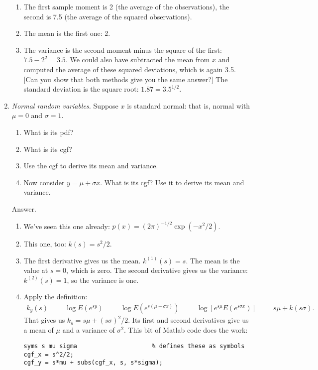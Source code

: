 \documentclass[11pt]{article}
\begin{document}
\begin{enumerate}
\begin{enumerate}
\item The first sample moment is 2 (the average of the observations),
the second is 7.5 (the average of the squared observations).
\item The mean is the first one:  2.
\item The variance is the second moment minus the square of the first:
$7.5 - 2^2 = 3.5 $.
We could also have subtracted the mean from $x$
and computed the average of these squared deviations, which is again 3.5.
[Can you show that both methods give you the same answer?]
The standard deviation is the square root:  $1.87 = 3.5^{1/2} $.
\end{enumerate}

\item {\it Normal random variables.\/}
Suppose $x$ is standard normal:  that is, normal with $\mu = 0$ and $\sigma = 1$.
\begin{enumerate}
\item What is its pdf?
\item What is its cgf?
\item Use the cgf to derive its mean and variance.
\item Now consider $y = \mu + \sigma x$.
What is its cgf?
Use it to derive its mean and variance.
\end{enumerate}
%
Answer.
\begin{enumerate}
\item We've seen this one already:
$ p(x) = (2 \pi)^{-1/2} \exp(-x^2/2)$.
\item This one, too:  $ k(s) = s^2/2$.
\item The first derivative gives us the mean.
$k^{(1)}(s) = s$.
The mean is the value at $s=0$, which is zero.
The second derivative gives us the variance:
$k^{(2)}(s) = 1$,
so the variance is one.
\item Apply the definition:
\begin{eqnarray*}
    k_y(s) &=& \log E (e^{sy})
            \;\;=\;\; \log E (e^{s(\mu + \sigma x)})
             \;\;=\;\; \log \left[ e^{s\mu} E ( e^{ s\sigma x}) \right]
             \;\;=\;\; s \mu + k(s \sigma) .
\end{eqnarray*}
That gives us $k_y = s \mu + (s \sigma)^2/2 $.
Its first and second derivatives give us a mean of $\mu$ and a variance of $\sigma^2$.
This bit of Matlab code does the work:
\begin{verbatim}
syms s mu sigma                     % defines these as symbols
cgf_x = s^2/2;
cgf_y = s*mu + subs(cgf_x, s, s*sigma);


\end{verbatim}
\end{enumerate}
\end{enumerate}
\end{document}
